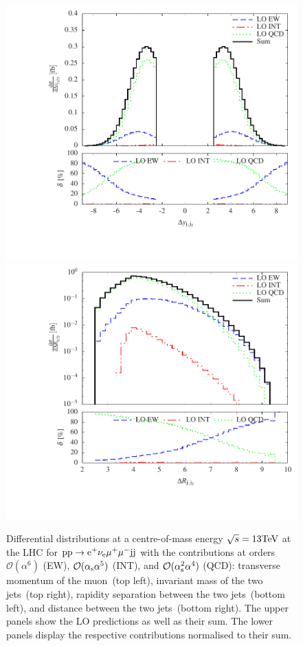 \documentclass[11pt]{cernrep}
\newcommand{\MP}[1]{{ {\color{blue}{ [MP: #1]}} }}
\begin{document}
\begin{figure}[htbp]
\begin{center}
   \includegraphics[scale=0.5]{figs/histogram_rapidity_separation_j1j2}
   \includegraphics[scale=0.5]{figs/histogram_distance_djj12}
\caption{Differential distributions at a centre-of-mass energy $\sqrt{s}=13{\rm TeV}$ at the LHC for ${\rm p} {\rm p} \to {\rm e}^+  \nu_{\rm e}  \mu^+ \mu^- {\rm j} {\rm j}$ with the contributions at orders $\mathcal{O} (\alpha^6)$ (EW), $\mathcal{O} (\alpha_{\rm s}\alpha^5)$ (INT), and $\mathcal{O} (\alpha_{\rm s}^2\alpha^4)$ (QCD): 
                transverse momentum of the muon~(top left),
                invariant mass of the two jets~(top right),
                rapidity separation between the two jets~(bottom left), and
                distance between the two jets~(bottom right).
                The upper panels show the LO predictions as well as their sum.
                The lower panels display the respective contributions normalised to their sum.
                \MP{Old plots to be updated but same qualitative conclusion.}}
\label{fig:diffcontr}
\end{center}
\end{figure}
\end{document}
